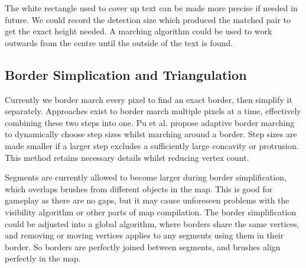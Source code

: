 \documentclass{IEEEtran}
\begin{document}
The white rectangle used to cover up text can be made more precise if needed in future. We could record the detection size which produced the matched pair to get the exact height needed. A marching algorithm could be used to work outwards from the centre until the outside of the text is found.

\subsection{Border Simplication and Triangulation}

Currently we border march every pixel to find an exact border, then simplify it separately. Approaches exist to border march multiple pixels at a time, effectively combining these two steps into one. Pu et al. \cite{pu2008adaptive} propose adaptive border marching to dynamically choose step sizes whilst marching around a border. Step sizes are made smaller if a larger step excludes a sufficiently large concavity or protrusion. This method retains necessary details whilst reducing vertex count.

Segments are currently allowed to become larger during border simplification, which overlaps brushes from different objects in the map. This is good for gameplay as there are no gaps, but it may cause unforeseen problems with the visibility algorithm or other parts of map compilation. The border simplification could be adjusted into a global algorithm, where borders share the same vertices, and removing or moving vertices applies to any segments using them in their border. So borders are perfectly joined between segments, and brushes align perfectly in the map.



\end{document}
